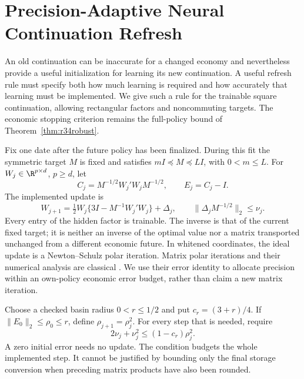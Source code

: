 \section{Precision-Adaptive Neural Continuation Refresh}
\label{sec:r37precision}
An old continuation can be inaccurate for a changed economy and nevertheless
provide a useful initialization for learning its new continuation. A useful
refresh rule must specify both how much learning is required and how accurately
that learning must be implemented. We give such a rule for the trainable
square continuation, allowing rectangular factors and noncommuting targets.
The economic stopping criterion remains the full-policy bound of
Theorem~\ref{thm:r34robust}.

Fix one date after the future policy has been finalized. During this fit the
symmetric target $M$ is fixed and satisfies $mI\preceq M\preceq LI$, with
$0<m\leq L$. For $W_j\in\R^{p\times d}$, $p\geq d$, let
\[
 C_j=M^{-1/2}W_j'W_jM^{-1/2},\qquad E_j=C_j-I.
\]
The implemented update is
\begin{equation}\label{eq:r37update}
 W_{j+1}=\tfrac12 W_j\{3I-M^{-1}W_j'W_j\}+\Delta_j,
 \qquad \|\Delta_jM^{-1/2}\|_2\leq\nu_j.
\end{equation}
Every entry of the hidden factor is trainable. The inverse is that of the
current fixed target; it is neither an inverse of the optimal value nor a
matrix transported unchanged from a different economic future. In whitened
coordinates, the ideal update is a Newton--Schulz polar iteration. Matrix
polar iterations and their numerical analysis are classical
\citep{r37higham2008}. We use their error identity to allocate precision within
an own-policy economic error budget, rather than claim a new matrix iteration.

Choose a checked basin radius $0<r\leq1/2$ and put $c_r=(3+r)/4$. If
$\|E_0\|_2\leq\rho_0\leq r$, define $\rho_{j+1}=\rho_j^2$. For every
step that is needed, require
\begin{equation}\label{eq:r37precision}
 2\nu_j+\nu_j^2\leq(1-c_r)\rho_j^2.
\end{equation}
A zero initial error needs no update. The condition budgets the whole
implemented step. It cannot be justified by bounding only the final storage
conversion when preceding matrix products have also been rounded.

